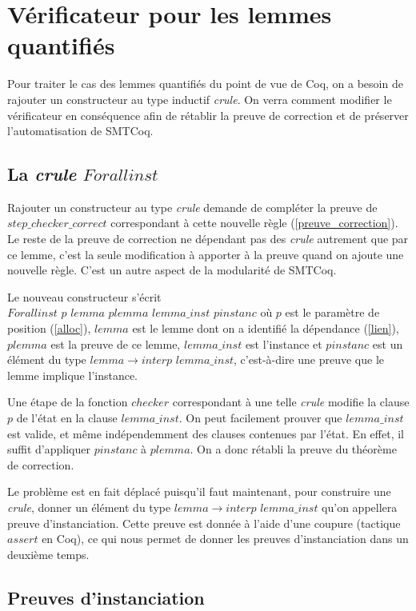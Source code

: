 \documentclass[11pt]{article}
\begin{document}
\section{Vérificateur pour les lemmes quantifiés} \label{instanciations}

Pour traiter le cas des lemmes quantifiés du point de vue de Coq, on a besoin de rajouter un constructeur au type inductif \textit{crule}. On verra comment modifier le vérificateur en conséquence afin de rétablir la preuve de correction et de préserver l'automatisation de SMTCoq.


\subsection{La \textit{crule} $Forallinst$}

Rajouter un constructeur au type \textit{crule} demande de compléter la preuve de  $step\_checker\_correct$ correspondant à cette nouvelle règle (\ref{preuve_correction}). Le reste de la preuve de correction ne dépendant pas des \textit{crule} autrement que par ce lemme, c'est la seule modification à apporter à la preuve quand on ajoute une nouvelle règle. C'est un autre aspect de la modularité de SMTCoq. \medbreak

Le nouveau constructeur s'écrit $Forallinst\,\, p\,\, lemma\,\, plemma \,\,lemma\_inst \,\,pinstanc$ où $p$ est le para\-mètre de position (\ref{alloc}), $lemma$ est le lemme dont on a identifié la dépendance (\ref{lien}), $plemma$ est la preuve de ce lemme, $lemma\_inst$ est l'instance et $pinstanc$ est un élément du type $lemma \rightarrow interp \,\, lemma\_inst$, c'est-à-dire une preuve que le lemme implique l'instance. \medbreak

Une étape de la fonction $checker$ correspondant à une telle \textit{crule} modifie la clause $p$ de l'état en la clause $lemma\_inst$. On peut facilement prouver que $lemma\_inst$ est valide, et même indépendemment des clauses contenues par l'état. En effet, il suffit d'appliquer $pinstanc$ à $plemma$. On a donc rétabli la preuve du théorème de correction.\medbreak

Le problème est en fait déplacé puisqu'il faut maintenant, pour construire une \textit{crule}, donner un élément du type $lemma \rightarrow interp \,\, lemma\_inst$ qu'on appellera preuve d'instanciation. Cette preuve est donnée à l'aide d'une coupure (tactique $assert$ en Coq), ce qui nous permet de donner les preuves d'instanciation dans un deuxième temps.

\subsection{Preuves d'instanciation}
\end{document}
